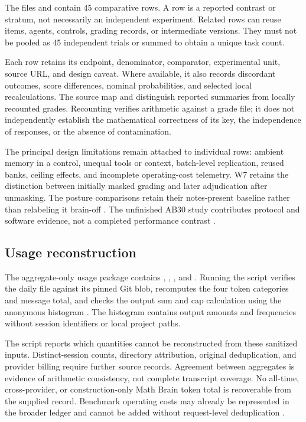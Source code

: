 The files  and  contain 45 comparative rows. A row is a reported contrast or stratum, not necessarily an independent experiment. Related rows can reuse items, agents, controls, grading records, or intermediate versions. They must not be pooled as 45 independent trials or summed to obtain a unique task count.

Each row retains its endpoint, denominator, comparator, experimental unit, source URL, and design caveat. Where available, it also records discordant outcomes, score differences, nominal probabilities, and selected local recalculations. The source map and  distinguish reported summaries from locally recounted grades. Recounting verifies arithmetic against a grade file; it does not independently establish the mathematical correctness of its key, the independence of responses, or the absence of contamination.

The principal design limitations remain attached to individual rows: ambient memory in a control, unequal tools or context, batch-level replication, reused banks, ceiling effects, and incomplete operating-cost telemetry. W7 retains the distinction between initially masked grading and later adjudication after unmasking. The posture comparisons retain their notes-present baseline rather than relabeling it brain-off \citep{benchmark_w7raw,benchmark_w7adj,benchmark_w7audit,benchmark_m3posture}. The unfinished AB30 study contributes protocol and software evidence, not a completed performance contrast \citep{ab30readme,ab30prereg}.

\subsection{Usage reconstruction}

The aggregate-only usage package contains , , , and . Running the script verifies the daily file against its pinned Git blob, recomputes the four token categories and message total, and checks the output sum and cap calculation using the anonymous histogram \citep{ledgerdaily,ledgerhalf}. The histogram contains output amounts and frequencies without session identifiers or local project paths.

The script reports which quantities cannot be reconstructed from these sanitized inputs. Distinct-session counts, directory attribution, original deduplication, and provider billing require further source records. Agreement between aggregates is evidence of arithmetic consistency, not complete transcript coverage. No all-time, cross-provider, or construction-only Math Brain token total is recoverable from the supplied record. Benchmark operating costs may already be represented in the broader ledger and cannot be added without request-level deduplication \citep{ledgerbuilder,ledgersessions}.

